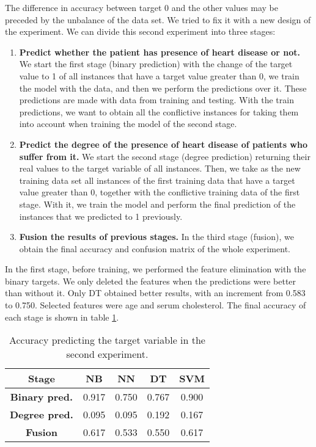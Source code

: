 The difference in accuracy between target 0 and the other values may be preceded by the unbalance of the data set. We tried to fix it with a new design of the experiment. We can divide this second experiment into three stages: 
\begin{enumerate}
    \item \textbf{Predict whether the patient has presence of heart disease or not.} We start the first stage (binary prediction) with the change of the target value to 1 of all instances that have a target value greater than 0, we train the model with the data, and then we perform the predictions over it. These predictions are made with data from training and testing. With the train predictions, we want to obtain all the conflictive instances for taking them into account when training the model of the second stage.
    \item \textbf{Predict the degree of the presence of heart disease of patients who suffer from it.} We start the second stage (degree prediction) returning their real values to the target variable of all instances. Then, we take as the new training data set all instances of the first training data that have a target value greater than 0, together with the conflictive training data of the first stage. With it, we train the model and perform the final prediction of the instances that we predicted to 1 previously.
    \item \textbf{Fusion the results of previous stages.} In the third stage (fusion), we obtain the final accuracy and confusion matrix of the whole experiment.
\end{enumerate}

In the first stage, before training, we performed the feature elimination with the binary targets. We only deleted the features when the predictions were better than without it. Only DT obtained better results, with an increment from 0.583 to 0.750. Selected features were age and serum cholesterol. The final accuracy of each stage is shown in table \ref{tab:second_exp}.

\begin{table}[hbtp]
    \centering
    \begin{tabular}{c c c c c}
        \toprule
        \textbf{Stage} & \textbf{NB} & \textbf{NN} & \textbf{DT} & \textbf{SVM} \\ \midrule
        \textbf{Binary pred.} & 0.917 & 0.750 &  0.767 & 0.900 \\
        \textbf{Degree pred.} & 0.095 & 0.095 & 0.192 & 0.167 \\
        \textbf{Fusion} & 0.617 & 0.533 & 0.550 & 0.617 \\
        \bottomrule
    \end{tabular}
    \caption{Accuracy predicting the target variable in the second experiment.}
    \label{tab:second_exp}
\end{table}


